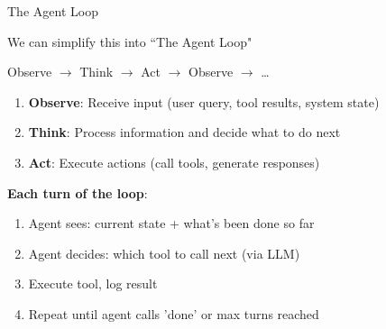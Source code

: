 \documentclass[aspectratio=169]{beamer}
\begin{document}
\begin{frame}{The Agent Loop}
\begin{center}
We can simplify this into ``The Agent Loop"
\vspace{0.5cm}

\Large
Observe $\rightarrow$ Think $\rightarrow$ Act $\rightarrow$ Observe $\rightarrow$ \ldots
\end{center}
\vspace{0.8cm}
\begin{enumerate}
    \item \textbf{Observe}: Receive input (user query, tool results, system state)
    \item \textbf{Think}: Process information and decide what to do next
    \item \textbf{Act}: Execute actions (call tools, generate responses)
\end{enumerate}
\vspace{0.3cm}

\textbf{Each turn of the loop}:
\begin{enumerate}
    \item Agent sees: current state + what's been done so far
    \item Agent decides: which tool to call next (via LLM)
    \item Execute tool, log result
    \item Repeat until agent calls 'done' or max turns reached
\end{enumerate}
\end{frame}
\end{document}
